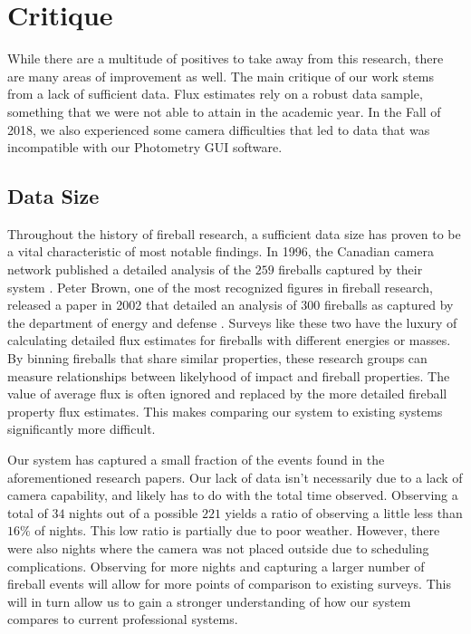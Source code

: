 \section{Critique}

While there are a multitude of positives to take away from this research, there are many areas of improvement as well.  
The main critique of our work stems from a lack of sufficient data.
Flux estimates rely on a robust data sample, something that we were not able to attain in the academic year. 
In the Fall of 2018, we also experienced some camera difficulties that led to data that was incompatible with our Photometry GUI software.


\subsection{Data Size}

Throughout the history of fireball research, a sufficient data size has proven to be a vital characteristic of most notable findings.
In 1996, the Canadian camera network published a detailed analysis of the $259$ fireballs captured by their system \cite{halliday_innisfree_1981}.
Peter Brown, one of the most recognized figures in fireball research, released a paper in 2002 that detailed an analysis of $300$ fireballs as captured by the department of energy and defense \cite{brown_p_flux_2002}.
Surveys like these two have the luxury of calculating detailed flux estimates for fireballs with different energies or masses.
By binning fireballs that share similar properties, these research groups can measure relationships between likelyhood of impact and fireball properties.
The value of average flux is often ignored and replaced by the more detailed fireball property flux estimates.
This makes comparing our system to existing systems significantly more difficult.


Our system has captured a small fraction of the events found in the aforementioned research papers.
Our lack of data isn't necessarily due to a lack of camera capability, and likely has to do with the total time observed. 
Observing a total of $34$ nights out of a possible $221$ yields a ratio of observing a little less than $16\%$ of nights. 
This low ratio is partially due to poor weather.
However, there were also nights where the camera was not placed outside due to scheduling complications.
Observing for more nights and capturing a larger number of fireball events will allow for more points of comparison to existing surveys.
This will in turn allow us to gain a stronger understanding of how our system compares to current professional systems.


